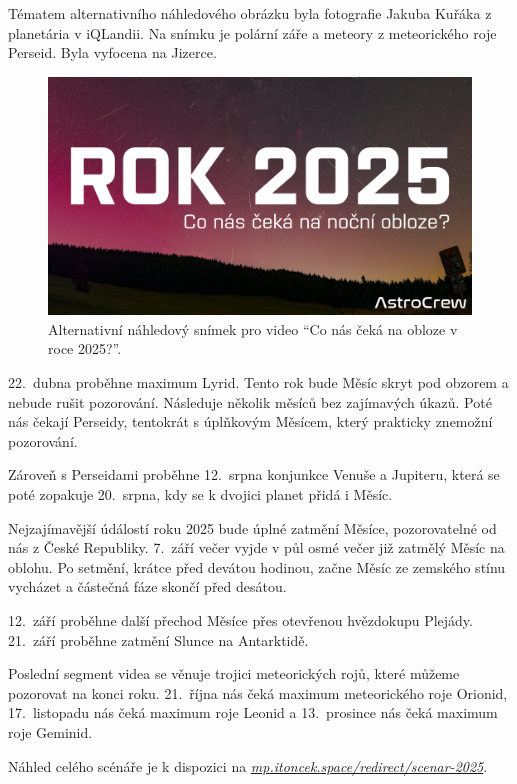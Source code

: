 \documentclass[12pt,a4paper,titlepage]{article}
\newcommand{\link}[2]{\href{#1}{\textcolor{link-color}{\textit{#2}}}}%
\begin{document}
Tématem alternativního náhledového obrázku byla fotografie Jakuba Kuřáka z planetária v iQLandii. Na snímku je polární záře a meteory z meteorického roje Perseid. Byla vyfocena na Jizerce. 

\begin{figure}[H]
	\centering
	\includegraphics[width=.95\textwidth]{nahledovka-v1.jpg}
	\caption{Alternativní náhledový snímek pro video \enquote{Co nás čeká na obloze v roce 2025?}.}\label{prac:nahledovka-v1}
\end{figure}

22.\ dubna proběhne maximum Lyrid. Tento rok bude Měsíc skryt pod obzorem a nebude rušit pozorování. Následuje několik měsíců bez zajímavých úkazů. Poté nás čekají Perseidy, tentokrát s úplňkovým Měsícem, který prakticky znemožní pozorování.

Zároveň s Perseidami proběhne 12.\ srpna konjunkce Venuše a Jupiteru, která se poté zopakuje 20.\ srpna, kdy se k dvojici planet přidá i Měsíc. 

Nejzajímavější údálostí roku 2025 bude úplné zatmění Měsíce, pozorovatelné od nás z České Republiky. 7.\ září večer vyjde v půl osmé večer již zatmělý Měsíc na oblohu. Po setmění, krátce před devátou hodinou, začne Měsíc ze zemského stínu vycházet a částečná fáze skončí před desátou.

12.\ září proběhne další přechod Měsíce přes otevřenou hvězdokupu Plejády. 21.\ září proběhne zatmění Slunce na Antarktidě.

Poslední segment videa se věnuje trojici meteorických rojů, které můžeme pozorovat na konci roku. 21.\ října nás čeká maximum meteorického roje Orionid, 17.\ listopadu nás čeká maximum roje Leonid a 13.\ prosince nás čeká maximum roje Geminid.

Náhled celého scénáře je k dispozici na \link{https://mp.itoncek.space/redirect/scenar-2025}{mp.itoncek.space/redirect/scenar-2025}.
\end{document}
